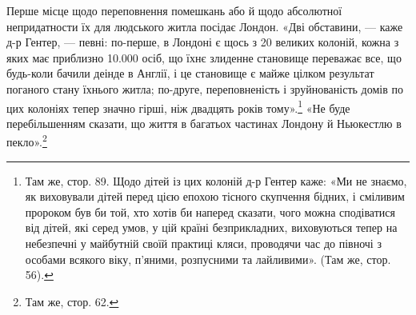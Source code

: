 Перше місце щодо переповнення помешкань або й щодо абсолютної
непридатности їх для людського житла посідає Лондон.
«Дві обставини, — каже д-р Гентер, — певні: по-перше, в Лондоні
є щось з 20 великих колоній, кожна з яких має приблизно
\num{10.000}  осіб, що їхнє злиденне становище переважає все, що будь-коли
бачили деінде в Англії, і це становище є майже цілком результат
поганого стану їхнього житла; по-друге, переповненість і зруйнованість
домів по цих колоніях тепер значно гірші, ніж двадцять
років тому».\footnote{
Там же, стор. 89. Щодо дітей із цих колоній д-р Гентер каже:
«Ми не знаємо, як виховували дітей перед цією епохою тісного скупчення
бідних, і сміливим пророком був би той, хто хотів би наперед сказати,
чого можна сподіватися від дітей, які серед умов, у цій країні безприкладних,
виховуються тепер на небезпечні у майбутній своїй практиці кляси,
проводячи час до півночі з особами всякого віку, п'яними, розпусними та
лайливими». (Там же, стор. 56).
} «Не буде перебільшенням сказати, що
життя в багатьох частинах Лондону й Ньюкестлю в пекло».\footnote{
Там же, стор. 62.
}

